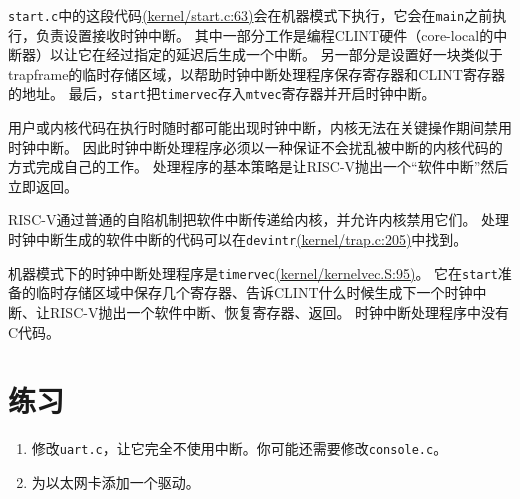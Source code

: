 \texttt{start.c}中的这段代码\href{https://github.com/mit-pdos/xv6-riscv/blob/riscv//kernel/start.c#L63/start.c:63}{(kernel/start.c:63)}会在机器模式下执行，它会在\texttt{main}之前执行，负责设置接收时钟中断。
其中一部分工作是编程CLINT硬件（core-local的中断器）以让它在经过指定的延迟后生成一个中断。
另一部分是设置好一块类似于trapframe的临时存储区域，以帮助时钟中断处理程序保存寄存器和CLINT寄存器的地址。
最后，\texttt{start}把\texttt{timervec}存入\texttt{mtvec}寄存器并开启时钟中断。

用户或内核代码在执行时随时都可能出现时钟中断，内核无法在关键操作期间禁用时钟中断。
因此时钟中断处理程序必须以一种保证不会扰乱被中断的内核代码的方式完成自己的工作。
处理程序的基本策略是让RISC-V抛出一个“软件中断”然后立即返回。

RISC-V通过普通的自陷机制把软件中断传递给内核，并允许内核禁用它们。
处理时钟中断生成的软件中断的代码可以在\texttt{devintr}\href{https://github.com/mit-pdos/xv6-riscv/blob/riscv//kernel/trap.c#L205}{(kernel/trap.c:205)}中找到。

机器模式下的时钟中断处理程序是\texttt{timervec}\href{https://github.com/mit-pdos/xv6-riscv/blob/riscv//kernel/kernelvec.S#L95}{(kernel/kernelvec.S:95)}。
它在\texttt{start}准备的临时存储区域中保存几个寄存器、告诉CLINT什么时候生成下一个时钟中断、让RISC-V抛出一个软件中断、恢复寄存器、返回。
时钟中断处理程序中没有C代码。

\section{练习}
\begin{enumerate}
    \item 修改\texttt{uart.c}，让它完全不使用中断。你可能还需要修改\texttt{console.c}。
    \item 为以太网卡添加一个驱动。
\end{enumerate}

